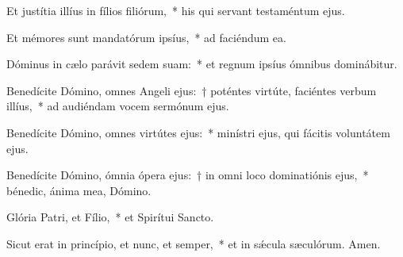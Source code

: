 \item Et justítia illíus in fílios filiórum,~* his qui servant testaméntum ejus.

\item Et mémores sunt mandatórum ipsíus,~* ad faciéndum ea.

\item Dóminus in cælo parávit sedem suam:~* et regnum ipsíus ómnibus dominábitur.

\item Benedícite Dómino, omnes Angeli ejus:~† poténtes virtúte, faciéntes verbum illíus,~* ad audiéndam vocem sermónum ejus.

\item Benedícite Dómino, omnes virtútes ejus:~* minístri ejus, qui fácitis voluntátem ejus.

\item Benedícite Dómino, ómnia ópera ejus:~† in omni loco dominatiónis ejus,~* bénedic, ánima mea, Dómino.

\item Glória Patri, et Fílio,~* et Spirítui Sancto.

\item Sicut erat in princípio, et nunc, et semper,~* et in sǽcula sæculórum. Amen.

